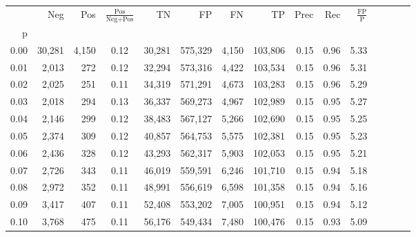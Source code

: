 \begin{tabular}{rrrcrrrrrrrrrrr}
\toprule
{} &     Neg &    Pos & $\frac{\text{Pos}}{\text{Neg}+\text{Pos}}$ &       TN &       FP &       FN &       TP &  Prec &   Rec & $\frac{\text{FP}}{\text{P}}$ \\
p    &         &        &                                            &          &          &          &          &       &       &                              \\
\midrule
0.00 &  30,281 &  4,150 &                                       0.12 &   30,281 &  575,329 &    4,150 &  103,806 &  0.15 &  0.96 &                         5.33 \\
0.01 &   2,013 &    272 &                                       0.12 &   32,294 &  573,316 &    4,422 &  103,534 &  0.15 &  0.96 &                         5.31 \\
0.02 &   2,025 &    251 &                                       0.11 &   34,319 &  571,291 &    4,673 &  103,283 &  0.15 &  0.96 &                         5.29 \\
0.03 &   2,018 &    294 &                                       0.13 &   36,337 &  569,273 &    4,967 &  102,989 &  0.15 &  0.95 &                         5.27 \\
0.04 &   2,146 &    299 &                                       0.12 &   38,483 &  567,127 &    5,266 &  102,690 &  0.15 &  0.95 &                         5.25 \\
0.05 &   2,374 &    309 &                                       0.12 &   40,857 &  564,753 &    5,575 &  102,381 &  0.15 &  0.95 &                         5.23 \\
0.06 &   2,436 &    328 &                                       0.12 &   43,293 &  562,317 &    5,903 &  102,053 &  0.15 &  0.95 &                         5.21 \\
0.07 &   2,726 &    343 &                                       0.11 &   46,019 &  559,591 &    6,246 &  101,710 &  0.15 &  0.94 &                         5.18 \\
0.08 &   2,972 &    352 &                                       0.11 &   48,991 &  556,619 &    6,598 &  101,358 &  0.15 &  0.94 &                         5.16 \\
0.09 &   3,417 &    407 &                                       0.11 &   52,408 &  553,202 &    7,005 &  100,951 &  0.15 &  0.94 &                         5.12 \\
0.10 &   3,768 &    475 &                                       0.11 &   56,176 &  549,434 &    7,480 &  100,476 &  0.15 &  0.93 &                         5.09 \\

\end{tabular}
